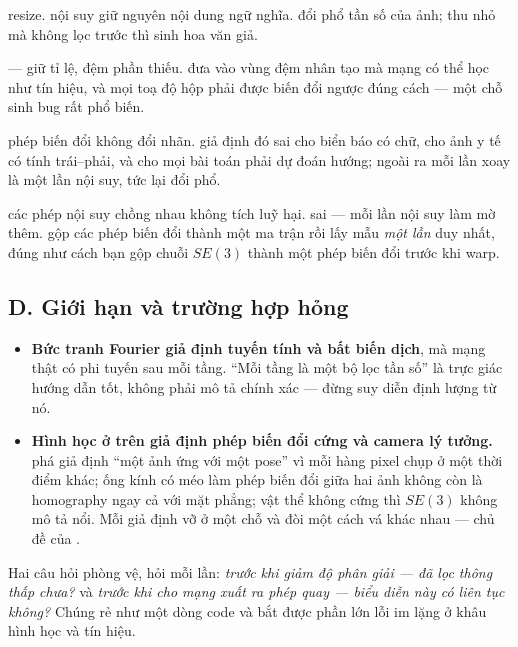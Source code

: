 \documentclass[../../../deep_learning.tex]{subfiles}
\begin{document}
\begin{mach}
\item {} \gp resize. \gd nội suy giữ nguyên nội dung ngữ nghĩa. \gia đổi phổ tần số của ảnh; thu nhỏ mà không lọc trước thì sinh hoa văn giả.
\item {} \gp {} --- giữ tỉ lệ, đệm phần thiếu. \gia đưa vào vùng đệm nhân tạo mà mạng có thể học như tín hiệu, và mọi toạ độ hộp phải được biến đổi ngược đúng cách --- một chỗ sinh bug rất phổ biến.
\item {} \gd phép biến đổi không đổi nhãn. \vdm giả định đó sai cho biển báo có chữ, cho ảnh y tế có tính trái--phải, và cho mọi bài toán phải dự đoán hướng; ngoài ra mỗi lần xoay là một lần nội suy, tức lại đổi phổ.
\item {} \gd các phép nội suy chồng nhau không tích luỹ hại. \gia sai --- mỗi lần nội suy làm mờ thêm. \gp gộp các phép biến đổi thành một ma trận rồi lấy mẫu \emph{một lần} duy nhất, đúng như cách bạn gộp chuỗi \(SE(3)\) thành một phép biến đổi trước khi warp.
\end{mach}

\subsection{D. Giới hạn và trường hợp hỏng}
\begin{itemize}
\item \textbf{Bức tranh Fourier giả định tuyến tính và bất biến dịch}, mà mạng thật có phi tuyến sau mỗi tầng. ``Mỗi tầng là một bộ lọc tần số'' là trực giác hướng dẫn tốt, không phải mô tả chính xác --- đừng suy diễn định lượng từ nó.
\item \textbf{Hình học ở trên giả định phép biến đổi cứng và camera lý tưởng.}  phá giả định ``một ảnh ứng với một pose'' vì mỗi hàng pixel chụp ở một thời điểm khác; ống kính có méo làm phép biến đổi giữa hai ảnh không còn là homography ngay cả với mặt phẳng; vật thể không cứng thì \(SE(3)\) không mô tả nổi. Mỗi giả định vỡ ở một chỗ và đòi một cách vá khác nhau --- chủ đề của .
\end{itemize}

\begin{cannho}
Hai câu hỏi phòng vệ, hỏi mỗi lần: \emph{trước khi giảm độ phân giải --- đã lọc thông thấp chưa?} và \emph{trước khi cho mạng xuất ra phép quay --- biểu diễn này có liên tục không?} Chúng rẻ như một dòng code và bắt được phần lớn lỗi im lặng ở khâu hình học và tín hiệu. 
\end{cannho}
\end{document}
